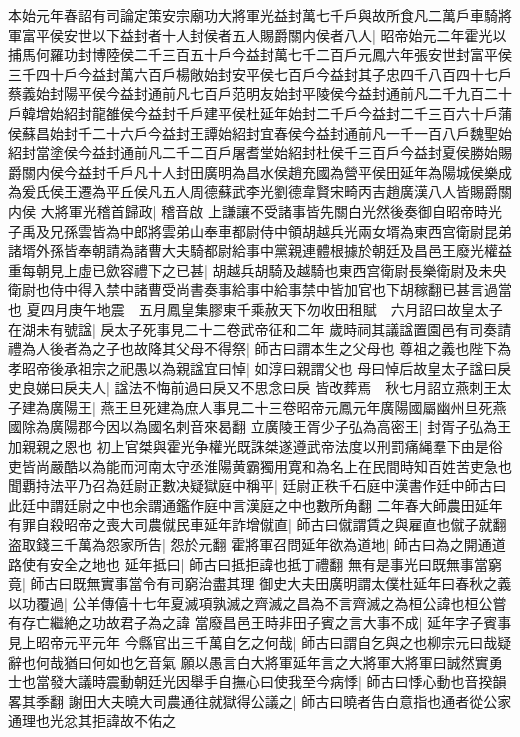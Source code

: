 本始元年春詔有司論定策安宗廟功大將軍光益封萬七千戶與故所食凡二萬戶車騎將軍富平侯安世以下益封者十人封侯者五人賜爵關内侯者八人|{
	昭帝始元二年霍光以捕馬何羅功封博陸侯二千三百五十戶今益封萬七千二百戶元鳳六年張安世封富平侯三千四十戶今益封萬六百戶楊敞始封安平侯七百戶今益封其子忠四千八百四十七戶蔡義始封陽平侯今益封通前凡七百戶范明友始封平陵侯今益封通前凡二千九百二十戶韓增始紹封龍雒侯今益封千戶建平侯杜延年始封二千戶今益封二千三百六十戶蒲侯蘇昌始封千二十六戶今益封王譚始紹封宜春侯今益封通前凡一千一百八戶魏聖始紹封當塗侯今益封通前凡二千二百戶屠耆堂始紹封杜侯千三百戶今益封夏侯勝始賜爵關内侯今益封千戶凡十人封田廣明為昌水侯趙充國為營平侯田延年為陽城侯樂成為爰氏侯王遷為平丘侯凡五人周德蘇武李光劉德韋賢宋畸丙吉趙廣漢八人皆賜爵關内侯}
大將軍光稽首歸政|{
	稽音啟}
上謙讓不受諸事皆先關白光然後奏御自昭帝時光子禹及兄孫雲皆為中郎將雲弟山奉車都尉侍中領胡越兵光兩女壻為東西宫衛尉昆弟諸壻外孫皆奉朝請為諸曹大夫騎都尉給事中黨親連體根據於朝廷及昌邑王廢光權益重每朝見上虛已歛容禮下之已甚|{
	胡越兵胡騎及越騎也東西宫衛尉長樂衛尉及未央衛尉也侍中得入禁中諸曹受尚書奏事給事中給事禁中皆加官也下胡稼翻已甚言過當也}
夏四月庚午地震　五月鳳皇集膠東千乘赦天下勿收田租賦　六月詔曰故皇太子在湖未有號諡|{
	戾太子死事見二十二卷武帝征和二年}
歲時祠其議諡置園邑有司奏請禮為人後者為之子也故降其父母不得祭|{
	師古曰謂本生之父母也}
尊祖之義也陛下為孝昭帝後承祖宗之祀愚以為親諡宜曰悼|{
	如淳曰親謂父也}
母曰悼后故皇太子諡曰戾史良娣曰戾夫人|{
	諡法不悔前過曰戾又不思念曰戾}
皆改葬焉　秋七月詔立燕刺王太子建為廣陽王|{
	燕王旦死建為庶人事見二十三卷昭帝元鳳元年廣陽國屬幽州旦死燕國除為廣陽郡今因以為國名刺音來曷翻}
立廣陵王胥少子弘為高密王|{
	封胥子弘為王加親親之恩也}
初上官桀與霍光争權光既誅桀遂遵武帝法度以刑罰痛䋲羣下由是俗吏皆尚嚴酷以為能而河南太守丞淮陽黄霸獨用寛和為名上在民間時知百姓苦吏急也聞覇持法平乃召為廷尉正數决疑獄庭中稱平|{
	廷尉正秩千石庭中漢書作廷中師古曰此廷中謂廷尉之中也余謂通鑑作庭中言漢庭之中也數所角翻}
二年春大師農田延年有罪自殺昭帝之喪大司農僦民車延年詐增僦直|{
	師古曰僦謂賃之與雇直也僦子就翻}
盗取錢三千萬為怨家所告|{
	怨於元翻}
霍將軍召問延年欲為道地|{
	師古曰為之開通道路使有安全之地也}
延年抵曰|{
	師古曰抵拒諱也抵丁禮翻}
無有是事光曰既無事當窮竟|{
	師古曰既無實事當令有司窮治盡其理}
御史大夫田廣明謂太僕杜延年曰春秋之義以功覆過|{
	公羊傳僖十七年夏滅項孰滅之齊滅之昌為不言齊滅之為桓公諱也桓公嘗有存亡繼絶之功故君子為之諱}
當廢昌邑王時非田子賓之言大事不成|{
	延年字子賓事見上昭帝元平元年}
今縣官出三千萬自乞之何哉|{
	師古曰謂自乞與之也柳宗元曰哉疑辭也何哉猶曰何如也乞音氣}
願以愚言白大將軍延年言之大將軍大將軍曰誠然實勇士也當發大議時震動朝廷光因舉手自撫心曰使我至今病悸|{
	師古曰悸心動也音揆韻畧其季翻}
謝田大夫曉大司農通往就獄得公議之|{
	師古曰曉者告白意指也通者從公家通理也光忿其拒諱故不佑之}
